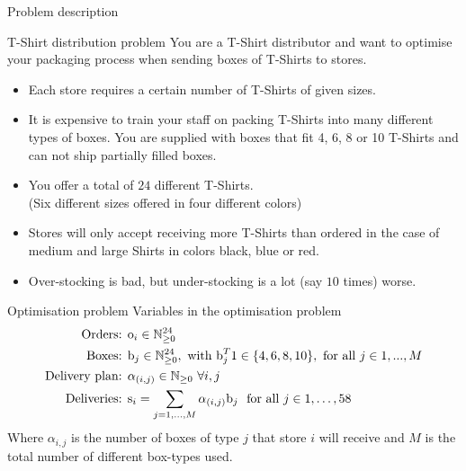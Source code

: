 \begin{frame}{Problem description}
    \begin{block}{T-Shirt distribution problem}
        You are a T-Shirt distributor and want to optimise your packaging
        process when sending boxes of T-Shirts to stores.
        \begin{itemize}
            \item Each store requires a
            certain number of T-Shirts of given sizes.
            \item It is expensive to train your staff on packing T-Shirts into many
            different types of boxes. You are supplied with boxes that fit 4, 6, 8
            or 10 T-Shirts and can not ship partially filled boxes.
            \item You offer a total of $24$ different T-Shirts.\\
                \hfill(Six different sizes offered in four different colors)
            \item Stores will only accept receiving more T-Shirts than ordered in the case of
            medium and large Shirts in colors black, blue or red.\\
            \item Over-stocking is bad, but under-stocking is a lot (say $10$ times) worse.
        \end{itemize}
    \end{block}
\end{frame}

\begin{frame}{Optimisation problem}
    Variables in the optimisation problem
    \begin{align*}
        \text{Orders: }& \text{o}_i \in \mathbb{N}_{\geq 0}^{24}\\
        \text{Boxes: }& \text{b}_j \in \mathbb{N}_{\geq 0}^{24}, \text{ with }
        \text{b}_j^T 1 \in \{4, 6, 8, 10\}, \text{ for all } j \in 1,...,M\\
        \text{Delivery plan: }& \alpha_{(i,j)}\in \mathbb{N}_{\geq 0}~ \forall i, j\\
        \text{Deliveries: }& \text{s}_i =
        \sum_{j = 1,\dots,M}\alpha_{(i,j)}\text{b}_j~\text{ for all } j \in 1,\dots,58\\
    \end{align*}
    Where $\alpha_{i,j}$ is the number of boxes of type $j$ that store $i$ will
    receive and $M$ is the total number of different box-types used.
\end{frame}

